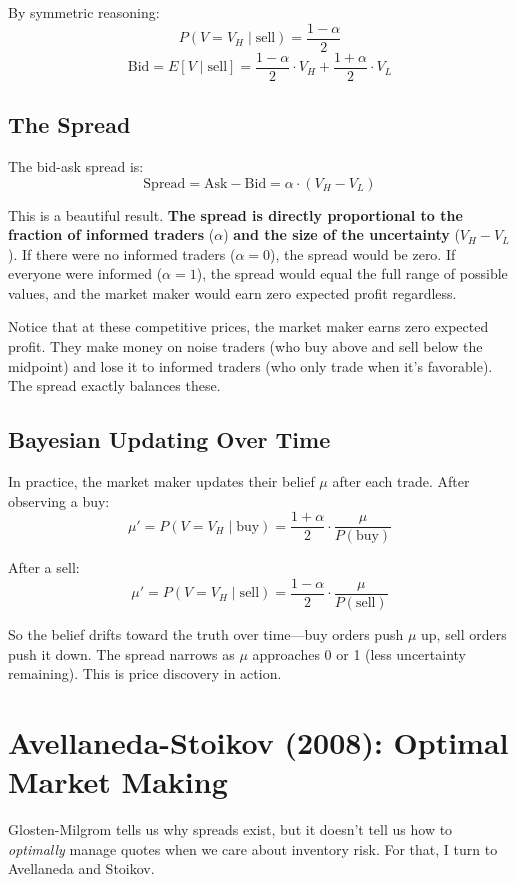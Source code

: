 \documentclass[11pt]{article}
\begin{document}
By symmetric reasoning:
\[
P(V = V_H \mid \text{sell}) = \frac{1-\alpha}{2}
\]
\[
\text{Bid} = E[V \mid \text{sell}] = \frac{1-\alpha}{2} \cdot V_H + \frac{1+\alpha}{2} \cdot V_L
\]

\subsection{The Spread}

The bid-ask spread is:
\[
\text{Spread} = \text{Ask} - \text{Bid} = \alpha \cdot (V_H - V_L)
\]

This is a beautiful result. \textbf{The spread is directly proportional to the fraction of informed traders} ($\alpha$) \textbf{and the size of the uncertainty} ($V_H - V_L$). If there were no informed traders ($\alpha = 0$), the spread would be zero. If everyone were informed ($\alpha = 1$), the spread would equal the full range of possible values, and the market maker would earn zero expected profit regardless.

Notice that at these competitive prices, the market maker earns zero expected profit. They make money on noise traders (who buy above and sell below the midpoint) and lose it to informed traders (who only trade when it's favorable). The spread exactly balances these.

\subsection{Bayesian Updating Over Time}

In practice, the market maker updates their belief $\mu$ after each trade. After observing a buy:
\[
\mu' = P(V = V_H \mid \text{buy}) = \frac{1+\alpha}{2} \cdot \frac{\mu}{P(\text{buy})}
\]

After a sell:
\[
\mu' = P(V = V_H \mid \text{sell}) = \frac{1-\alpha}{2} \cdot \frac{\mu}{P(\text{sell})}
\]

So the belief drifts toward the truth over time---buy orders push $\mu$ up, sell orders push it down. The spread narrows as $\mu$ approaches 0 or 1 (less uncertainty remaining). This is price discovery in action.

\section{Avellaneda-Stoikov (2008): Optimal Market Making}

Glosten-Milgrom tells us why spreads exist, but it doesn't tell us how to \emph{optimally} manage quotes when we care about inventory risk. For that, I turn to Avellaneda and Stoikov.
\end{document}
